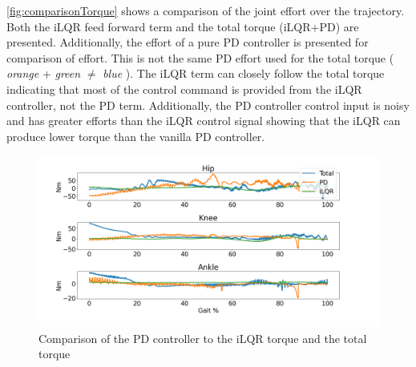 \autoref{fig:comparisonTorque} shows a comparison of the joint effort over the trajectory. Both the iLQR feed forward term and the total torque (iLQR+PD) are presented. Additionally, the effort of a pure PD controller is presented for comparison of effort. This is not the same PD effort used for the total torque ( \textit{orange} +  \textit{green} $\neq$  \textit{blue} ). The iLQR term can closely follow the total torque indicating that most of the control command is provided from the iLQR controller, not the PD term. Additionally, the PD controller control input is noisy and has greater efforts than the iLQR control signal showing that the iLQR can produce lower torque than the vanilla PD controller. 

\begin{figure}[h!]
    \centering
    \includegraphics[scale=0.35]{images/controllers/torque_compare.png}
    \caption[Torque Comparison of the iLQR controller]{Comparison of the PD controller to the iLQR torque and the total torque}
    \label{fig:comparisonTorque}
\end{figure}
